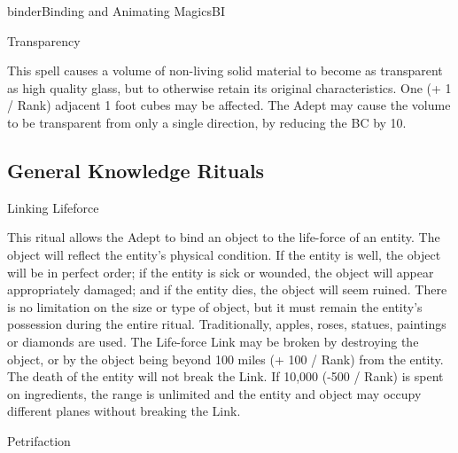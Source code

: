 \begin{college}[1.1]{binder}{Binding and Animating Magics}{BI}
\begin{spell}[G-10]{Transparency}
\begin{effects}
This spell causes a volume of non-living solid material to become as
transparent as high quality glass, but to otherwise retain its
original characteristics. One (+ 1 / Rank) adjacent 1 foot cubes may
be affected. The Adept may cause the volume to be transparent from
only a single direction, by reducing the BC by 10.
\end{effects}
\end{spell}

\subsection{General Knowledge Rituals}


\begin{ritual}[Q-1]{Linking Lifeforce}

\begin{effects}
This ritual allows the Adept to bind an object to the life-force of an
entity. The object will reflect the entity's physical condition. If
the entity is well, the object will be in perfect order; if the entity
is sick or wounded, the object will appear appropriately damaged; and
if the entity dies, the object will seem ruined. There is no
limitation on the size or type of object, but it must remain the
entity's possession during the entire ritual. Traditionally, apples,
roses, statues, paintings or diamonds are used. The Life-force Link
may be broken by destroying the object, or by the object being beyond
100 miles (+ 100 / Rank) from the entity. The death of the entity will
not break the Link. If 10,000 (-500 / Rank) is spent on ingredients,
the range is unlimited and the entity and object may occupy different
planes without breaking the Link.
\end{effects}
\end{ritual}

\begin{ritual}[Q-2]{Petrifaction}


\end{ritual}
\end{college}
